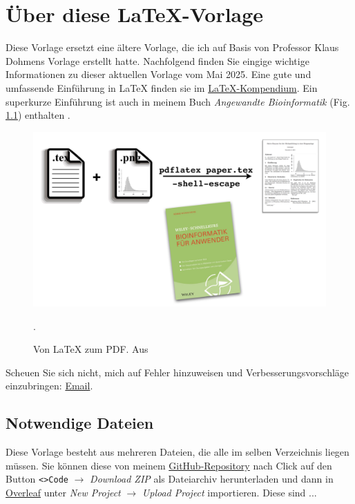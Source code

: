 \chapter{Über diese \LaTeX{}-Vorlage}
Diese Vorlage ersetzt eine ältere Vorlage, die ich auf Basis von Professor Klaus Dohmens Vorlage erstellt hatte. Nachfolgend finden Sie eingige wichtige Informationen zu dieser aktuellen Vorlage vom Mai 2025. Eine gute und umfassende Einführung in \LaTeX{} finden sie im \href{https://de.wikibooks.org/wiki/LaTeX-Kompendium}{LaTeX-Kompendium}. Ein superkurze Einführung ist auch in meinem Buch \textit{Angewandte Bioinformatik} (Fig. \ref{fig:latex}) enthalten \citep{Wuenschiers2016kap12}.

\begin{figure}[h]
    \centering
    \includegraphics[width=.7\columnwidth]{fig-latex.png}
    \caption{Von \LaTeX{} zum PDF. Aus \citep{Wuenschiers2016}}.
    \label{fig:latex}
\end{figure}

Scheuen Sie sich nicht, mich auf Fehler hinzuweisen und Verbesserungsvorschläge einzubringen: \href{mailto:rw@biowasserstoff.de?subject=HSMW LaTeX-Vorlage}{Email}.



\section{Notwendige Dateien}
Diese Vorlage besteht aus mehreren Dateien, die alle im selben Verzeichnis liegen müssen. Sie können diese von meinem \href{https://github.com/awkologist/HSMW-Template-BioChem-Group}{GitHub-Repository} nach Click auf den Button \verb+<>Code+ $\rightarrow$ \textit{Download ZIP} als Dateiarchiv herunterladen und dann in \href{https://www.overleaf.com}{Overleaf} unter \textit{New Project} $\rightarrow$ \textit{Upload Project} importieren. Diese sind ...

